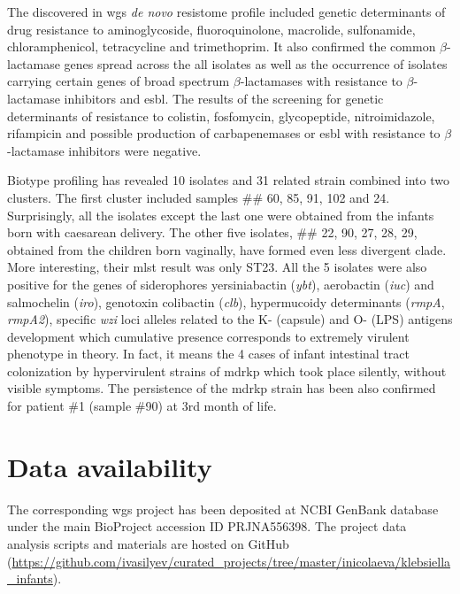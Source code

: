 \documentclass[12pt,a4paper]{article}
\newcommand{\betalactam}{$\beta$-lactam}
\begin{document}
The discovered in \gls{wgs} \textit{de novo} resistome profile included genetic determinants of drug resistance to
aminoglycoside, fluoroquinolone, macrolide, sulfonamide, chloramphenicol, tetracycline and trimethoprim.
It also confirmed the common \betalactam ase genes spread across the all isolates as well as the occurrence of isolates
carrying certain genes of broad spectrum \betalactam ases with resistance to \betalactam ase inhibitors and \gls{esbl}.
The results of the screening for genetic determinants of resistance to colistin, fosfomycin, glycopeptide,
nitroimidazole, rifampicin and possible production of carbapenemases or \gls{esbl} with resistance to \betalactam ase
inhibitors were negative.

Biotype profiling has revealed 10 isolates and 31 related strain combined into two clusters.
The first cluster included samples \#\# 60, 85, 91, 102 and 24.
Surprisingly, all the isolates except the last one were obtained from the infants born with caesarean delivery.
The other five isolates, \#\# 22, 90, 27, 28, 29, obtained from the children born vaginally,
have formed even less divergent clade.
More interesting, their \gls{mlst} result was only ST23.
All the 5 isolates were also positive for the genes of siderophores yersiniabactin (\textit{ybt}),
aerobactin (\textit{iuc}) and salmochelin (\textit{iro}), genotoxin colibactin (\textit{clb}),
hypermucoidy determinants (\textit{rmpA}, \textit{rmpA2}), specific \textit{wzi} loci alleles related to the
K- (capsule) and O- (LPS) antigens development which cumulative presence corresponds to extremely virulent phenotype
in theory.
In fact, it means the 4 cases of infant intestinal tract colonization by hypervirulent strains of \gls{mdrkp} which
took place silently, without visible symptoms.
The persistence of the \gls{mdrkp} strain has been also confirmed for patient \#1 (sample \#90) at 3rd month of life.

\section{Data availability}\label{sec:data}
The corresponding \gls{wgs} project has been deposited at NCBI GenBank database under the main
BioProject accession ID PRJNA556398.
The project data analysis scripts and materials are hosted on GitHub
(\url{https://github.com/ivasilyev/curated_projects/tree/master/inicolaeva/klebsiella_infants}).
\end{document}
